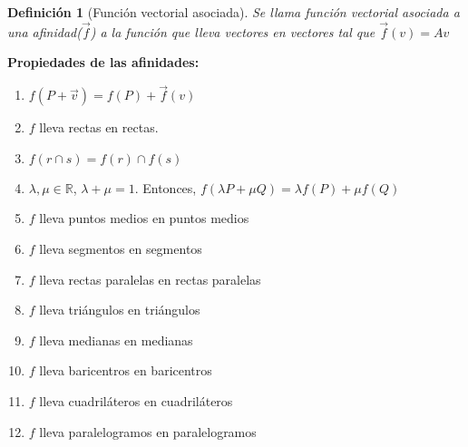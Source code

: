\documentclass[11pt, a4paper, titlepage]{article}
\newcommand{\R}{\mathbb{R}}
\renewcommand{\vec}{\overrightarrow}
\theoremstyle{theorem-style}
\theoremstyle{definition-style}
\newtheorem{ndef}{Definición}[section]
\theoremstyle{remark-style}
\theoremstyle{example-style}
\begin{document}
\begin{ndef}[Función vectorial asociada]
  Se llama función vectorial asociada a una afinidad($\vec{f}$) a la función que lleva vectores en vectores tal que $\vec{f}(v) = Av$
\end{ndef}

\textbf{Propiedades de las afinidades:}\\
\begin{enumerate}
\item $f(P + \vec{v}) = f(P) + \vec{f}(v)$
\item $f$ lleva rectas en rectas.
\item $f(r\cap s) = f(r) \cap f(s)$
\item $\lambda,\mu \in \R$, $\lambda+\mu=1$. Entonces, $f(\lambda P + \mu Q) = \lambda f(P) +  \mu f(Q)$
\item $f$ lleva puntos medios en puntos medios
\item $f$ lleva segmentos en segmentos
\item $f$ lleva rectas paralelas en rectas paralelas
\item $f$ lleva triángulos en triángulos
\item $f$ lleva medianas en medianas
\item $f$ lleva baricentros en baricentros
\item $f$ lleva cuadriláteros en cuadriláteros
\item $f$ lleva paralelogramos en paralelogramos
\end{enumerate}
\end{document}
